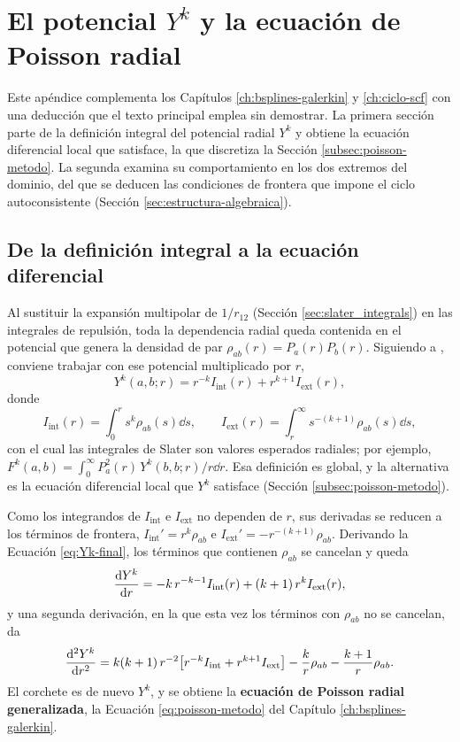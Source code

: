 \chapter{El potencial \texorpdfstring{$Y^k$}{Yk} y la ecuación de Poisson radial}
\label{ap:galerkin-poisson}

Este apéndice complementa los Capítulos \ref{ch:bsplines-galerkin} y \ref{ch:ciclo-scf} con una deducción que el texto principal emplea sin demostrar. La primera sección parte de la definición integral del potencial radial $Y^k$ y obtiene la ecuación diferencial local que satisface, la que discretiza la Sección \ref{subsec:poisson-metodo}. La segunda examina su comportamiento en los dos extremos del dominio, del que se deducen las condiciones de frontera que impone el ciclo autoconsistente (Sección \ref{sec:estructura-algebraica}).

\section{De la definición integral a la ecuación diferencial}
\label{sec:interaccion-electronica}

Al sustituir la expansión multipolar de $1/r_{12}$ (Sección \ref{sec:slater_integrals}) en las integrales de repulsión, toda la dependencia radial queda contenida en el potencial que genera la densidad de par $\rho_{ab}(r) = P_a(r) P_b(r)$. Siguiendo a \textcite{fischer1977}, conviene trabajar con ese potencial multiplicado por $r$,
\begin{equation}
\label{eq:Yk-final}
 Y^k(a,b;r) = r^{-k} I_{\text{int}}(r) + r^{k+1} I_{\text{ext}}(r),
\end{equation}
donde
\begin{equation}
 I_{\text{int}}(r) = \int_0^r s^k \rho_{ab}(s)\dd{s}, \qquad I_{\text{ext}}(r) = \int_r^\infty s^{-(k+1)} \rho_{ab}(s)\dd{s},
\end{equation}
con el cual las integrales de Slater son valores esperados radiales; por ejemplo, $F^k(a,b) = \int_0^\infty P_a^2(r)\, Y^k(b,b;r)/r \dd{r}$. Esa definición es global, y la alternativa es la ecuación diferencial local que $Y^k$ satisface (Sección \ref{subsec:poisson-metodo}).

Como los integrandos de $I_{\text{int}}$ e $I_{\text{ext}}$ no dependen de $r$, sus derivadas se reducen a los términos de frontera, $I_{\text{int}}' = r^k \rho_{ab}$ e $I_{\text{ext}}' = -r^{-(k+1)} \rho_{ab}$. Derivando la Ecuación \eqref{eq:Yk-final}, los términos que contienen $\rho_{ab}$ se cancelan y queda
\begin{equation}
\label{eq:Yk-prime-app}
 \dv{Y^k}{r} = -k\, r^{-k-1} I_{\text{int}}(r) + (k+1)\, r^{k} I_{\text{ext}}(r),
\end{equation}
y una segunda derivación, en la que esta vez los términos con $\rho_{ab}$ no se cancelan, da
\begin{equation}
 \dv[2]{Y^k}{r} = k(k+1)\, r^{-2}\qty[ r^{-k} I_{\text{int}} + r^{k+1} I_{\text{ext}} ] - \frac{k}{r}\rho_{ab} - \frac{k+1}{r}\rho_{ab}.
\end{equation}
El corchete es de nuevo $Y^k$, y se obtiene la \textbf{ecuación de Poisson radial generalizada}, la Ecuación \eqref{eq:poisson-metodo} del Capítulo \ref{ch:bsplines-galerkin}.

